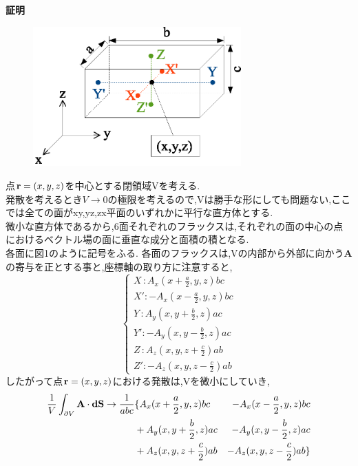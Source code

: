 \documentclass{jsarticle}
\begin{document}
\newpage
{\bf 証明}\\

\begin{figure}[htbp]
 \begin{center}
  \includegraphics[width=80mm]{3.1.eps}
 \end{center}
 \caption{}
 \label{fig:one}
\end{figure}
点${\bf r}=(x,y,z)$を中心とする閉領域Vを考える.\\
発散を考えるとき$V \to 0$の極限を考えるので,Vは勝手な形にしても問題ない,ここでは全ての面がxy,yz,zx平面のいずれかに平行な直方体とする.\\
微小な直方体であるから,6面それぞれのフラックスは,それぞれの面の中心の点におけるベクトル場の面に垂直な成分と面積の積となる.\\
各面に図1のように記号をふる.
各面のフラックスは,Vの内部から外部に向かう{\bf A}の寄与を正とする事と,座標軸の取り方に注意すると,
\begin{equation}
\left \{
\begin{array}{l}
X\,: A_x(x+\frac{a}{2},y,z)bc\\
X': -A_x(x-\frac{a}{2},y,z)bc\\
Y\,: A_y(x,y+\frac{b}{2},z)ac\\
Y': -A_y(x,y-\frac{b}{2},z)ac\\
Z\,: A_z(x,y,z+\frac{c}{2})ab\\
Z': -A_z(x,y,z-\frac{c}{2})ab
\end{array}
\right.
\end{equation}
したがって点${\bf r}=(x,y,z)$における発散は,Vを微小にしていき,
\begin{eqnarray}
\frac{1}{V}\int_{\partial V}^{}{\bf A}\cdot {\bf dS} \to \frac{1}{abc} &\{A_x(x+\frac{a}{2},y,z)bc & -A_x(x-\frac{a}{2},y,z)bc \\
 &+A_y(x,y+\frac{b}{2},z)ac&-A_y(x,y-\frac{b}{2},z)ac \\
&+A_z(x,y,z+\frac{c}{2})ab&-A_z(x,y,z-\frac{c}{2})ab \}
\end{eqnarray}
\end{document}
